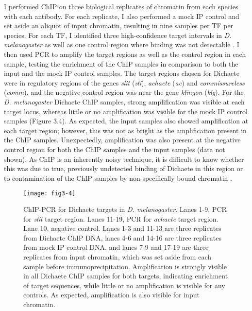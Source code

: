 I performed ChIP on three biological replicates of chromatin from each species with each antibody. For each replicate, I also performed a mock IP control and set aside an aliquot of input chromatin, resulting in nine samples per TF per species. For each TF, I identified three high-confidence target intervals in \emph{D. melanogaster} as well as one control region where binding was not detectable \citep{aleksic_role_2013,ferrero_soxneuro_2014}. I then used PCR to amplify the target regions as well as the control region in each sample, testing the enrichment of the ChIP samples in comparison to both the input and the mock IP control samples. The target regions chosen for Dichaete were in regulatory regions of the genes \emph{slit} (\emph{sli}), \emph{achaete} (\emph{ac}) and \emph{commissureless} (\emph{comm}), and the negative control region was near the gene \emph{klingon} (\emph{klg}). For the \emph{D. melanogaster} Dichaete ChIP samples, strong amplification was visible at each target locus, whereas little or no amplification was visible for the mock IP control samples (Figure 3.4). As expected, the input samples also showed amplification at each target region; however, this was not as bright as the amplification present in the ChIP samples. Unexpectedly, amplification was also present at the negative control region for both the ChIP samples and the input samples (data not shown). As ChIP is an inherently noisy technique, it is difficult to know whether this was due to true, previously undetected binding of Dichaete in this region or to contamination of the ChIP samples by non-specifically bound chromatin \citep{aleksic_chiping_2009,buck_chip-chip:_2004}.

\begin{figure}
\centering
\texttt{[image: fig3-4]}
\caption[ChIP-PCR for Dichaete targets in \emph{D. melanogaster}]{ChIP-PCR for Dichaete targets in \emph{D. melanogaster}. Lanes 1-9, PCR for \emph{slit} target region. Lanes 11-19, PCR for \emph{achaete} target region. Lane 10, negative control. Lanes 1-3 and 11-13 are three replicates from Dichaete ChIP DNA, lanes 4-6 and 14-16 are three replicates from mock IP control DNA, and lanes 7-9 and 17-19 are three replicates from input chromatin, which was set aside from each sample before immunoprecipitation. Amplification is strongly visible in all Dichaete ChIP samples for both targets, indicating enrichment of target sequences, while little or no amplification is visible for any controls. As expected, amplification is also visible for input chromatin.}
\label{Figure 3.4}
\end{figure}

